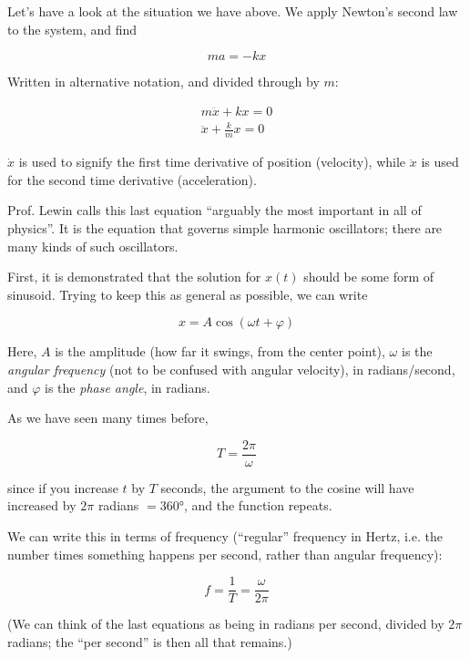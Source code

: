 Let's have a look at the situation we have above. We apply Newton's second law to the system, and find

\begin{equation}
m a = - k x
\end{equation}

Written in alternative notation, and divided through by $m$:

\begin{align}
m \ddot{x} + k x = 0\\
\ddot{x} + \frac{k}{m} x = 0
\end{align}

$\dot{x}$ is used to signify the first time derivative of position (velocity), while $\ddot{x}$ is used for the second time derivative (acceleration).

Prof. Lewin calls this last equation ``arguably the most important in all of physics''. It is the equation that governs simple harmonic oscillators; there are many kinds of such oscillators.

First, it is demonstrated that the solution for $x(t)$ should be some form of sinusoid. Trying to keep this as general as possible, we can write

\begin{equation}
x = A \cos(\omega t + \varphi)
\end{equation}

Here, $A$ is the amplitude (how far it swings, from the center point), $\omega$ is the \emph{angular frequency} (not to be confused with angular velocity), in radians/second, and $\varphi$ is the \emph{phase angle}, in radians.

As we have seen many times before,

\begin{equation}
T = \frac{2 \pi}{\omega}
\end{equation}

since if you increase $t$ by $T$ seconds, the argument to the cosine will have increased by $2 \pi$ radians $= \ang{360}$, and the function repeats.

We can write this in terms of frequency (``regular'' frequency in Hertz, i.e. the number times something happens per second, rather than angular frequency):

\begin{equation}
f = \frac{1}{T} = \frac{\omega}{2 \pi}
\end{equation}

(We can think of the last equations as being in radians per second, divided by $2 \pi$ radians; the ``per second'' is then all that remains.)

